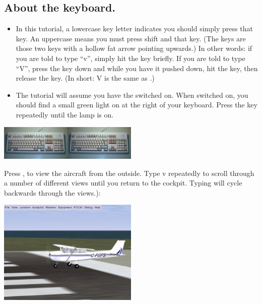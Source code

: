 \subsection*{About the keyboard.}

\begin{itemize}
    \item In this tutorial, a lowercase key letter indicates you should simply
  press that key. An uppercase means you must press shift and that key.
  (The \textcolor{blue}{} keys are those two keys with
  a hollow fat arrow pointing upwards.) In other words: if you are told to type
  ``v'', simply hit the  key briefly.
   If you are told to type ``V'',
  press the  key down and while you have it pushed down, hit the
   key, then release the   key. (In short: V is the same as
  .)
    \item The tutorial will assume you have the  switched on.
   When switched on, you should find a small green
  light on at the right of your keyboard. Press the
  \textcolor{green}{} key repeatedly until the lamp is on.
\end{itemize}

\begin{center}
\includegraphics[width=0.5\textwidth]{img/tut_7}
\end{center}

Press , to view the aircraft from the outside. Type v repeatedly to
scroll through a number of different views until you return to the cockpit.
Typing  will cycle backwards through the views.):

\begin{center}
\includegraphics[width=0.5\textwidth]{img/tut_8}
\end{center}

